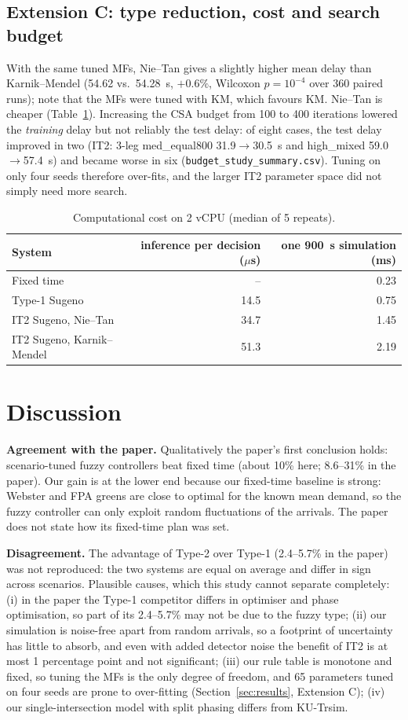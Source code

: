 \subsection{Extension C: type reduction, cost and search budget}
With the same tuned MFs, Nie--Tan gives a slightly higher mean delay than Karnik--Mendel (54.62 vs.\ 54.28~s, $+0.6\%$, Wilcoxon $p=10^{-4}$ over 360 paired runs); note that the MFs were tuned with KM, which favours KM. Nie--Tan is cheaper (Table~\ref{tab:cost}). Increasing the CSA budget from 100 to 400 iterations lowered the \emph{training} delay but not reliably the test delay: of eight cases, the test delay improved in two (IT2: 3-leg med\_equal800 31.9$\to$30.5~s and high\_mixed 59.0$\to$57.4~s) and became worse in six (\texttt{budget\_study\_summary.csv}). Tuning on only four seeds therefore over-fits, and the larger IT2 parameter space did not simply need more search.

\begin{table}[t]
\centering\small
\caption{Computational cost on 2 vCPU (median of 5 repeats).}\label{tab:cost}
\begin{tabular}{@{}lrr@{}}
\toprule
System & inference per decision ($\mu$s) & one 900~s simulation (ms) \\ \midrule
Fixed time & -- & 0.23 \\
Type-1 Sugeno & 14.5 & 0.75 \\
IT2 Sugeno, Nie--Tan & 34.7 & 1.45 \\
IT2 Sugeno, Karnik--Mendel & 51.3 & 2.19 \\ \bottomrule
\end{tabular}
\end{table}

\section{Discussion}
\textbf{Agreement with the paper.} Qualitatively the paper's first conclusion holds: scenario-tuned fuzzy controllers beat fixed time (about 10\% here; 8.6--31\% in the paper). Our gain is at the lower end because our fixed-time baseline is strong: Webster and FPA greens are close to optimal for the known mean demand, so the fuzzy controller can only exploit random fluctuations of the arrivals. The paper does not state how its fixed-time plan was set.

\textbf{Disagreement.} The advantage of Type-2 over Type-1 (2.4--5.7\% in the paper) was not reproduced: the two systems are equal on average and differ in sign across scenarios. Plausible causes, which this study cannot separate completely: (i) in the paper the Type-1 competitor differs in optimiser and phase optimisation, so part of its 2.4--5.7\% may not be due to the fuzzy type; (ii) our simulation is noise-free apart from random arrivals, so a footprint of uncertainty has little to absorb, and even with added detector noise the benefit of IT2 is at most 1 percentage point and not significant; (iii) our rule table is monotone and fixed, so tuning the MFs is the only degree of freedom, and 65 parameters tuned on four seeds are prone to over-fitting (Section~\ref{sec:results}, Extension C); (iv) our single-intersection model with split phasing differs from KU-Trsim.

